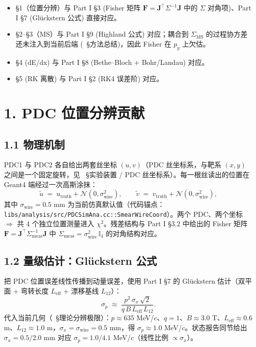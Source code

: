 \begin{itemize}
  \item §1（位置分辨）与 Part I §3 (Fisher 矩阵 $\mathbf F = \mathbf J^\top\Sigma^{-1}\mathbf J$ 中的 $\Sigma$ 对角项)、Part I §7 (Glückstern 公式) 直接对应。
  \item §2--§3（MS）与 Part I §9 (Highland 公式) 对应；耦合到 $\Sigma_\mathrm{MS}$ 的过程协方差还未注入到当前后端 (\StatusReport{}~§方法总结)，因此 Fisher 在 $p_y$ 上欠估。
  \item §4 (dE/dx) 与 Part I §8 (Bethe--Bloch + Bohr/Landau) 对应。
  \item §5 (RK 离散) 与 Part I §2 (RK4 误差阶) 对应。
\end{itemize}

\section{1. PDC 位置分辨贡献}
\label{sec:partIIa:budget:pdc-pos}

\subsection*{1.1 物理机制}

PDC1 与 PDC2 各自给出两套丝坐标 $(u, v)$（PDC 丝坐标系，与靶系 $(x, y)$ 之间是一个固定旋转，见 \StatusReport{}~§实验装置 / PDC 丝坐标系）。每一根丝读出的位置在 Geant4 端经过一次高斯涂抹：
\begin{equation}
  \tilde u \;=\; u_\mathrm{truth} + \mathcal N(0,\sigma_\mathrm{wire}^2),\qquad
  \tilde v \;=\; v_\mathrm{truth} + \mathcal N(0,\sigma_\mathrm{wire}^2),
  \label{eq:partIIa:budget:wire-smear}
\end{equation}
其中 $\sigma_\mathrm{wire}=0.5$ mm 为当前仿真默认值（代码锚点：\texttt{libs/analysis/src/PDCSimAna.cc::SmearWireCoord}）。两个 PDC、两个坐标 $\Rightarrow$ 共 4 个独立位置测量进入 $\chi^2$。残差结构与 Part I §3.2 中给出的 Fisher 矩阵 $\mathbf F = \mathbf J^\top\Sigma_\mathrm{meas}^{-1}\mathbf J$ 中 $\Sigma_\mathrm{meas} = \sigma_\mathrm{wire}^2\,\mathbb{I}_4$ 的对角结构对应。

\subsection*{1.2 量级估计：Glückstern 公式}

把 PDC 位置误差线性传播到动量误差，使用 Part I §7 的 Glückstern 估计（双平面 + 弯转长度 $L_\mathrm{eff}$ + 漂移基线 $L_{12}$）：
\begin{equation}
  \sigma_p \;\approx\; \frac{p^2\,\sigma_x\,\sqrt 2}{q\,B\,L_\mathrm{eff}\,L_{12}}.
  \label{eq:partIIa:budget:gluckstern}
\end{equation}
代入当前几何（\StatusReport{}~§理论分辨极限）：$p\approx 635$ MeV/$c$、$q=1$、$B\approx 3.0$ T、$L_\mathrm{eff}\approx 0.6$ m、$L_{12}\approx 1.0$ m，$\sigma_x = \sigma_\mathrm{wire}=0.5$ mm，得 $\sigma_p \approx 1.0$ MeV/$c$。状态报告同节给出 $\sigma_x{=}0.5/2.0$ mm 对应 $\sigma_p{=}1.0/4.1$ MeV/$c$（线性比例 $\propto\sigma_x$）。

